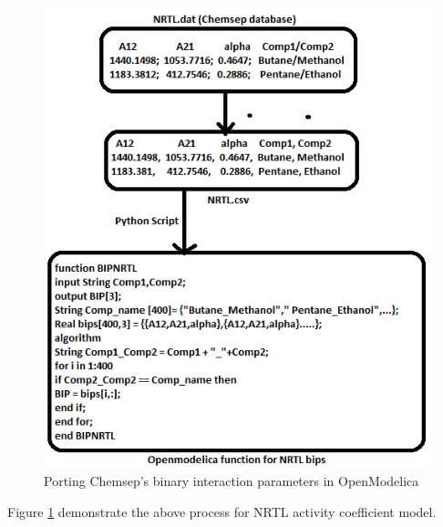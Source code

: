 \documentclass[12pt]{report}
\begin{document}
\begin{figure}
\centering
\includegraphics[width=0.8\linewidth]{BT3}
\caption{Porting Chemsep's binary interaction parameters in OpenModelica}
\label{fig:BT3}
\end{figure}

Figure \ref{fig:BT3} demonstrate the above process for NRTL activity coefficient model.
\end{document}
